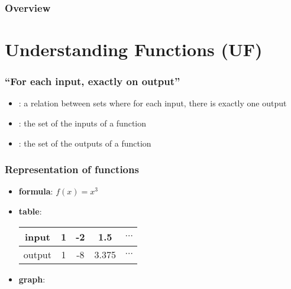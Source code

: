 \documentclass[10pt,t,presentation,ignorenonframetext,aspectratio=169]{beamer}
\title[\course]{\lecTitle}
\institute[Ohio State]
{
  \medskip
}
\date[\week]{\semester}
\author{Tae Eun Kim, Ph.D.}
\begin{document}
\begin{frame}
  \titlepage
\end{frame}

\begin{frame}
  \frametitle{Overview}
  \tableofcontents
\end{frame}

\section{Understanding Functions (UF)}
\label{sec:underst-funct-uf}
\begin{frame}
  \frametitle{``For each input, exactly on output''}
  \begin{definition}
    \begin{itemize}
    \item {}: a relation between sets where for each
      input, there is exactly one output
    \item {}: the set of the inputs of a function
    \item {}: the set of the outputs of a function
    \end{itemize}
  \end{definition}
\end{frame}

\begin{frame}
  \frametitle{Representation of functions}
  \begin{itemize}
  \item \textbf{formula}: $f(x) = x^3$
  \item \textbf{table}: \\
    \begin{center}
      \begin{tabular}{c|c|c|c|c}
        input & 1 & -2 & 1.5 & $\cdots$ \\ \hline
        output & 1 & -8 & 3.375 & $\cdots$
      \end{tabular}
    \end{center}
  \item \textbf{graph}: \\
    \begin{center}
    \end{center}
  \end{itemize}
\end{frame}
\end{document}
